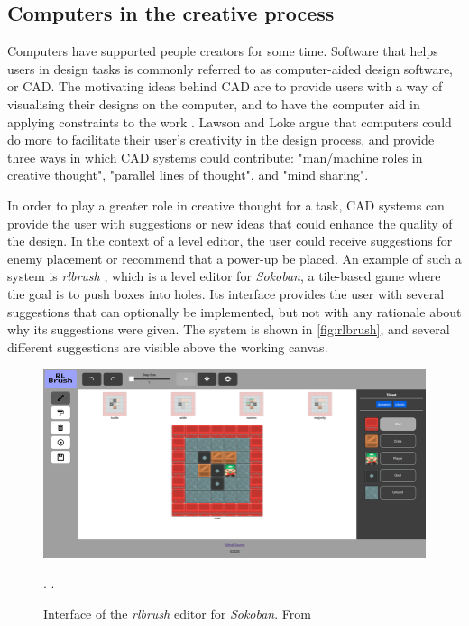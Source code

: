 \subsection{Computers in the creative process}

Computers have supported people creators for some time. Software that helps users in design
tasks is commonly referred to as computer-aided design software, or CAD. The motivating
ideas behind CAD are to provide users with a way of visualising their designs on the
computer, and to have the computer aid in applying constraints to the work
\cite{lawson1997}. Lawson and Loke argue that computers could do more to facilitate their
user's creativity in the design process, and provide three ways in which CAD systems could
contribute: "man/machine roles in creative thought", "parallel lines of thought", and "mind
sharing".

In order to play a greater role in creative thought for a task, CAD systems can provide the
user with suggestions or new ideas that could enhance the quality of the design. In the
context of a level editor, the user could receive suggestions for enemy placement or
recommend that a power-up be placed. An example of such a system is \emph{rlbrush} \cite{delarosa2021},
which is a level editor for \emph{Sokoban}, a tile-based game where the goal is to push
boxes into holes. Its interface provides the user with several suggestions that can
optionally be implemented, but not with any rationale about why its suggestions were given.
The system is shown in \autoref{fig:rlbrush}, and several different suggestions are visible
above the working canvas.

\begin{figure}[h]
    \centering
    \includegraphics[width=\linewidth]{img/fig8-rlbrush.png}
    \caption{Interface of the \emph{rlbrush} editor for \emph{Sokoban}. From \cite{delarosa2021}}.
    \label{fig:rlbrush}.
\end{figure}

